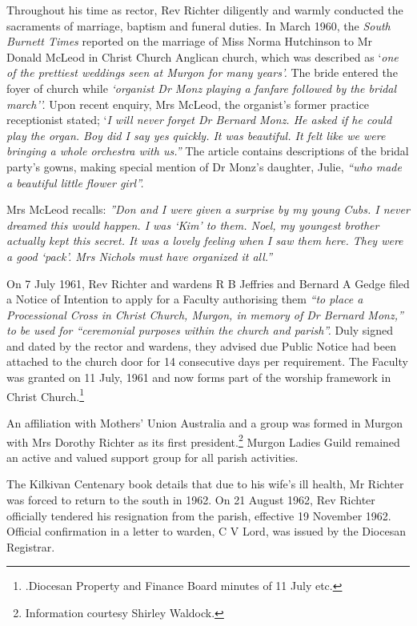 Throughout his time as rector, Rev Richter diligently and warmly conducted the sacraments of marriage, baptism and funeral duties. In March 1960, the \emph{South Burnett Times} reported on the marriage of Miss Norma Hutchinson to Mr Donald McLeod in Christ Church Anglican church, which was described as `\emph{one of the prettiest weddings seen at Murgon for many years'.} The bride entered the foyer of church while \emph{`organist Dr Monz playing a fanfare followed by the bridal march''.} Upon recent enquiry, Mrs McLeod, the organist's former practice receptionist stated; `\emph{I will never forget Dr Bernard Monz. He asked if he could play the organ. Boy did I say yes quickly. It was beautiful. It felt like we were bringing a whole orchestra with us.''} The article contains descriptions of the bridal party's gowns, making special mention of Dr Monz's daughter, Julie, \emph{``who made a beautiful little flower girl''.}



Mrs McLeod recalls: \emph{''Don and I were given a surprise by my young Cubs. I never dreamed this would happen. I was `Kim' to them. Noel, my youngest brother actually kept this secret. It was a lovely feeling when I saw them here. They were a good `pack'. Mrs Nichols must have organized it all.''}



On 7 July 1961, Rev Richter and wardens R B Jeffries and Bernard A Gedge filed a Notice of Intention to apply for a Faculty authorising them \emph{``to place a Processional Cross in Christ Church, Murgon, in memory of Dr Bernard Monz,'' to be used for ``ceremonial purposes within the church and parish''.} Duly signed and dated by the rector and wardens, they advised due Public Notice had been attached to the church door for 14 consecutive days per requirement. The Faculty was granted on 11 July, 1961 and now forms part of the worship framework in Christ Church.\footnote{.Diocesan Property and Finance Board minutes of 11 July etc.}


An affiliation with Mothers' Union Australia and a group was formed in Murgon with Mrs Dorothy Richter as its first president.\footnote{Information courtesy Shirley Waldock.} Murgon Ladies Guild remained an active and valued support group for all parish activities.


The Kilkivan Centenary book details that due to his wife's ill health, Mr Richter was forced to return to the south in 1962. On 21 August 1962, Rev Richter officially tendered his resignation from the parish, effective 19 November 1962. Official confirmation in a letter to warden, C V Lord, was issued by the Diocesan Registrar.



